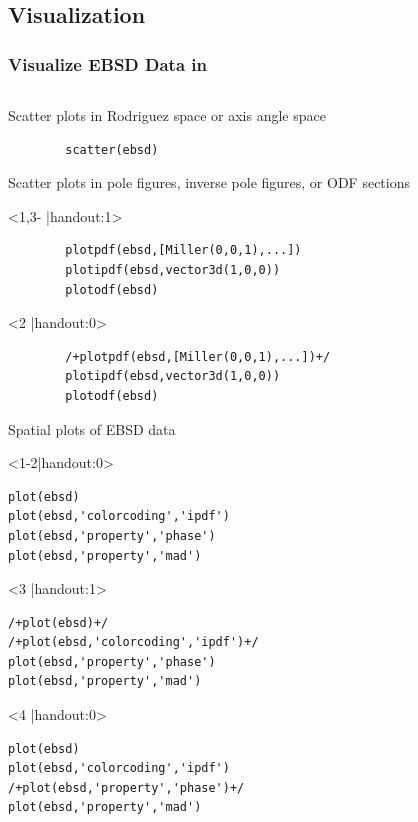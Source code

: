 \subsection*{Visualization}

\begin{frame}[fragile]
  \frametitle{Visualize EBSD Data in \MTEX}

  \begin{columns}
    \begin{column}{8.5cm}

Scatter plots in Rodriguez space or axis angle space

\begin{lstlisting}
		scatter(ebsd)
\end{lstlisting}

\pause

Scatter plots in pole figures, inverse pole figures, or ODF sections


\begin{onlyenv}<1,3- |handout:1>
\begin{lstlisting}
		plotpdf(ebsd,[Miller(0,0,1),...])
		plotipdf(ebsd,vector3d(1,0,0))
		plotodf(ebsd)
\end{lstlisting}
\end{onlyenv}

\begin{onlyenv}<2 |handout:0>
\begin{lstlisting}
		/+plotpdf(ebsd,[Miller(0,0,1),...])+/
		plotipdf(ebsd,vector3d(1,0,0))
		plotodf(ebsd)
\end{lstlisting}
\end{onlyenv}

\pause

Spatial plots of EBSD data

\begin{onlyenv}<1-2|handout:0>
\begin{lstlisting}
plot(ebsd)
plot(ebsd,'colorcoding','ipdf')
plot(ebsd,'property','phase')
plot(ebsd,'property','mad')
\end{lstlisting}
\end{onlyenv}

\begin{onlyenv}<3 |handout:1>
\begin{lstlisting}
/+plot(ebsd)+/
/+plot(ebsd,'colorcoding','ipdf')+/
plot(ebsd,'property','phase')
plot(ebsd,'property','mad')
\end{lstlisting}
\end{onlyenv}

\begin{onlyenv}<4 |handout:0>
\begin{lstlisting}
plot(ebsd)
plot(ebsd,'colorcoding','ipdf')
/+plot(ebsd,'property','phase')+/
plot(ebsd,'property','mad')
\end{lstlisting}
\end{onlyenv}


\end{column}
\end{columns}
\end{frame}
